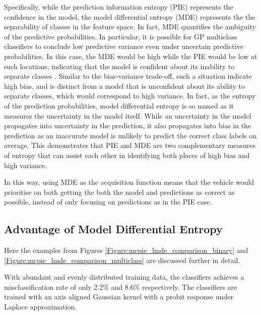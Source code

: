 			Specifically, while the prediction information entropy (PIE) represents the confidence in the model, the model differential entropy (MDE) represents the the separability of classes in the feature space. In fact, MDE quantifies the ambiguity of the predictive probabilities. In particular, it is possible for GP multiclass classifiers to conclude low predictive variance even under uncertain predictive probabilities. In this case, the MDE would be high while the PIE would be low at such locations, indicating that the model is confident about its inability to separate classes \citep{AsherBender}. Similar to the bias-variance trade-off, such a situation indicate high bias, and is distinct from a model that is unconfident about its ability to separate classes, which would correspond to high variance. In fact, as the entropy of the prediction probabilities, model differential entropy is so named as it measures the uncertainty in the model itself. While an uncertainty in the model propagates into uncertainty in the prediction, it also propagates into bias in the prediction as an inaccurate model is unlikely to predict the correct class labels on average. This demonstrates that PIE and MDE are two complementary measures of entropy that can assist each other in identifying both places of high bias and high variance.
			
			In this way, using MDE as the acquisition function means that the vehicle would prioritise on both getting the both the model and predictions as correct as possible, instead of only focusing on predictions as in the PIE case.
			
		\subsection{Advantage of Model Differential Entropy}
		
			Here the examples from Figures \ref{Figure:mcpie_lmde_comparison_binary} and \ref{Figure:mcpie_lmde_comparison_multiclass} are discussed further in detail.
			
			With abundant and evenly distributed training data, the classifiers achieves a misclassification rate of only 2.2\% and 8.6\% respectively. The classifiers are trained with an axis aligned Gaussian kernel with a probit response under Laplace approximation. 
			
